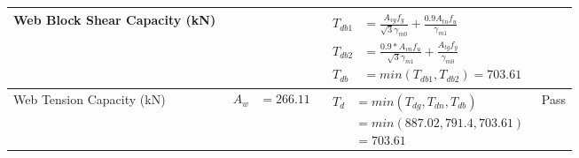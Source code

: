 \documentclass{article}%
\begin{document}
\begin{longtable}{|p{4cm}|p{6cm}|p{5.5cm}|p{1.5cm}|}
\hline%
Web Block Shear Capacity (kN)&&$\begin{aligned}T_{db1} &= \frac{A_{vg} f_{y}}{\sqrt{3} \gamma_{m0}} + \frac{0.9 A_{tn} f_{u}}{\gamma_{m1}}\\ T_{db2} &= \frac{0.9*A_{vn} f_{u}}{\sqrt{3} \gamma_{m1}} + \frac{A_{tg} f_{y}}{\gamma_{m0}}\\ T_{db} &= min(T_{db1}, T_{db2})= 703.61\end{aligned}$&\\%
\hline%
Web Tension Capacity (kN)&$\begin{aligned} A_w &=266.11\end{aligned}$&$\begin{aligned} T_d &= min(T_{dg},T_{dn},T_{db})\\ &= min(887.02,791.4,703.61)\\ &=703.61\end{aligned}$&Pass\\%
\hline%
\end{longtable}

%
\newpage%
\end{document}
